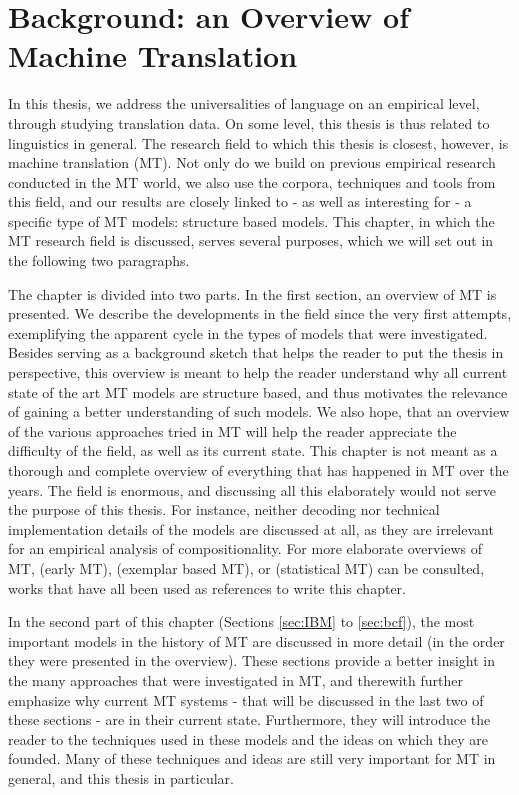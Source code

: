 \chapter{Background: an Overview of Machine Translation}

In this thesis, we address the universalities of language on an empirical level, through studying translation data. On some level, this thesis is thus related to linguistics in general. The research field to which this thesis is closest, however, is machine translation (MT). Not only do we build on previous empirical research conducted in the MT world, we also use the corpora, techniques and tools from this field, and our results are closely linked to - as well as interesting for - a specific type of MT models: structure based models. This chapter, in which the MT research field is discussed, serves several purposes, which we will set out in the following two paragraphs.

The chapter is divided into two parts. In the first section, an overview of MT is presented. We describe the developments in the field since the very first attempts, exemplifying the apparent cycle in the types of models that were investigated. Besides serving as a background sketch that helps the reader to put the thesis in perspective, this overview is meant to help the reader understand why all current state of the art MT models are structure based, and thus motivates the relevance of gaining a better understanding of such models. We also hope, that an overview of the various approaches tried in MT will help the reader appreciate the difficulty of the field, as well as its current state. This chapter is not meant as a thorough and complete overview of everything that has happened in MT over the years. The field is enormous, and discussing all this elaborately would not serve the purpose of this thesis. For instance, neither decoding nor technical implementation details of the models are discussed at all, as they are irrelevant for an empirical analysis of compositionality. For more elaborate overviews of MT, \cite{hutchins1992introduction} (early MT), \cite{somers1999review} (exemplar based MT), \cite{koehn2008statistical} or \cite{wu2005mt} (statistical MT) can be consulted, works that have all been used as references to write this chapter.

In the second part of this chapter (Sections \ref{sec:IBM} to \ref{sec:bcf}), the most important models in the history of MT are discussed in more detail (in the order they were presented in the overview). These sections provide a better insight in the many approaches that were investigated in MT, and therewith further emphasize why current MT systems - that will be discussed in the last two of these sections - are in their current state. Furthermore, they will introduce the reader to the techniques used in these models and the ideas on which they are founded. Many of these techniques and ideas are still very important for MT in general, and this thesis in particular.

